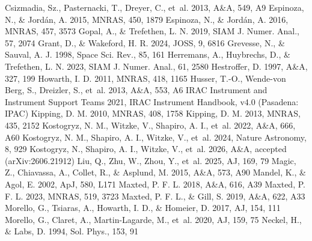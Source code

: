 \documentclass{aa}
\begin{document}
\begin{thebibliography}{}
 Csizmadia, Sz., Pasternacki, T., Dreyer, C., et~al. 2013, A\&A, 549, A9
 Espinoza, N., \& Jord{\'a}n, A. 2015, MNRAS, 450, 1879
 Espinoza, N., \& Jord{\'a}n, A. 2016, MNRAS, 457, 3573
 Gopal, A., \& Trefethen, L. N. 2019, SIAM J. Numer. Anal., 57, 2074
 Grant, D., \& Wakeford, H. R. 2024, JOSS, 9, 6816
 Grevesse, N., \& Sauval, A. J. 1998, Space Sci. Rev., 85, 161
 Herremans, A., Huybrechs, D., \& Trefethen, L. N. 2023, SIAM J. Numer. Anal., 61, 2580
 Hestroffer, D. 1997, A\&A, 327, 199
 Howarth, I. D. 2011, MNRAS, 418, 1165
 Husser, T.-O., Wende-von Berg, S., Dreizler, S., et~al. 2013, A\&A, 553, A6
 IRAC Instrument and Instrument Support Teams 2021, IRAC Instrument Handbook, v4.0 (Pasadena: IPAC)
 Kipping, D. M. 2010, MNRAS, 408, 1758
 Kipping, D. M. 2013, MNRAS, 435, 2152
 Kostogryz, N. M., Witzke, V., Shapiro, A. I., et~al. 2022, A\&A, 666, A60
 Kostogryz, N. M., Shapiro, A. I., Witzke, V., et~al. 2024, Nature Astronomy, 8, 929
 Kostogryz, N., Shapiro, A. I., Witzke, V., et~al. 2026, A\&A, accepted (arXiv:2606.21912)
 Liu, Q., Zhu, W., Zhou, Y., et~al. 2025, AJ, 169, 79
 Magic, Z., Chiavassa, A., Collet, R., \& Asplund, M. 2015, A\&A, 573, A90
 Mandel, K., \& Agol, E. 2002, ApJ, 580, L171
 Maxted, P. F. L. 2018, A\&A, 616, A39
 Maxted, P. F. L. 2023, MNRAS, 519, 3723
 Maxted, P. F. L., \& Gill, S. 2019, A\&A, 622, A33
 Morello, G., Tsiaras, A., Howarth, I. D., \& Homeier, D. 2017, AJ, 154, 111
 Morello, G., Claret, A., Martin-Lagarde, M., et~al. 2020, AJ, 159, 75
 Neckel, H., \& Labs, D. 1994, Sol. Phys., 153, 91

\end{thebibliography}
\end{document}

